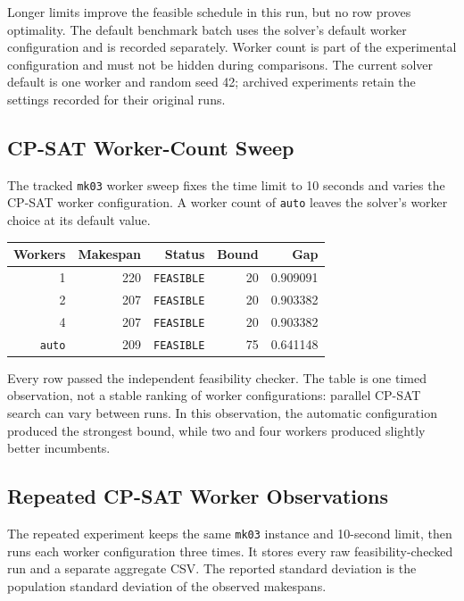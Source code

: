﻿\documentclass[11pt]{article}
\begin{document}
Longer limits improve the feasible schedule in this run, but no row proves
optimality. The default benchmark batch uses the solver's default worker
configuration and is recorded separately. Worker count is part of the
experimental configuration and must not be hidden during comparisons.
The current solver default is one worker and random seed 42; archived
experiments retain the settings recorded for their original runs.

\subsection{CP-SAT Worker-Count Sweep}

The tracked \texttt{mk03} worker sweep fixes the time limit to 10 seconds and
varies the CP-SAT worker configuration. A worker count of \texttt{auto} leaves
the solver's worker choice at its default value.

\begin{table}[h]
\centering
\begin{tabular}{rrrrr}
\toprule
Workers & Makespan & Status & Bound & Gap \\
\midrule
1 & 220 & \texttt{FEASIBLE} & 20 & 0.909091 \\
2 & 207 & \texttt{FEASIBLE} & 20 & 0.903382 \\
4 & 207 & \texttt{FEASIBLE} & 20 & 0.903382 \\
\texttt{auto} & 209 & \texttt{FEASIBLE} & 75 & 0.641148 \\
\bottomrule
\end{tabular}
\end{table}

Every row passed the independent feasibility checker. The table is one timed
observation, not a stable ranking of worker configurations: parallel CP-SAT
search can vary between runs. In this observation, the automatic
configuration produced the strongest bound, while two and four workers
produced slightly better incumbents.

\subsection{Repeated CP-SAT Worker Observations}

The repeated experiment keeps the same \texttt{mk03} instance and 10-second
limit, then runs each worker configuration three times. It stores every raw
feasibility-checked run and a separate aggregate CSV. The reported standard
deviation is the population standard deviation of the observed makespans.
\end{document}
